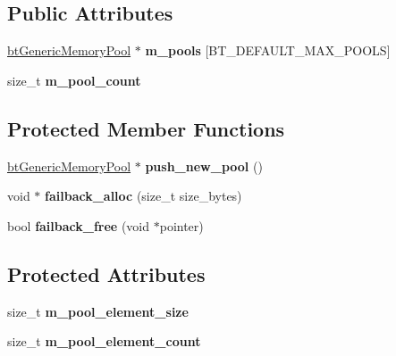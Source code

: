 \subsection*{Public Attributes}
\begin{DoxyCompactItemize}
\item 
\hypertarget{classbt_generic_pool_allocator_a6a423ffc81fd7032cf04c1c2203b9a60}{\hyperlink{classbt_generic_memory_pool}{bt\+Generic\+Memory\+Pool} $\ast$ {\bfseries m\+\_\+pools} \mbox{[}B\+T\+\_\+\+D\+E\+F\+A\+U\+L\+T\+\_\+\+M\+A\+X\+\_\+\+P\+O\+O\+L\+S\mbox{]}}\label{classbt_generic_pool_allocator_a6a423ffc81fd7032cf04c1c2203b9a60}

\item 
\hypertarget{classbt_generic_pool_allocator_a683e472dcc9efbc63a9218ba2e1a4dc4}{size\+\_\+t {\bfseries m\+\_\+pool\+\_\+count}}\label{classbt_generic_pool_allocator_a683e472dcc9efbc63a9218ba2e1a4dc4}

\end{DoxyCompactItemize}
\subsection*{Protected Member Functions}
\begin{DoxyCompactItemize}
\item 
\hypertarget{classbt_generic_pool_allocator_a1de453f3e3f6fffa62ff6ac46466af0b}{\hyperlink{classbt_generic_memory_pool}{bt\+Generic\+Memory\+Pool} $\ast$ {\bfseries push\+\_\+new\+\_\+pool} ()}\label{classbt_generic_pool_allocator_a1de453f3e3f6fffa62ff6ac46466af0b}

\item 
\hypertarget{classbt_generic_pool_allocator_a6c04580d308b8dd29b1e6e26eb69ac54}{void $\ast$ {\bfseries failback\+\_\+alloc} (size\+\_\+t size\+\_\+bytes)}\label{classbt_generic_pool_allocator_a6c04580d308b8dd29b1e6e26eb69ac54}

\item 
\hypertarget{classbt_generic_pool_allocator_a7a8a33e2e4350d452d468b6a42ccf233}{bool {\bfseries failback\+\_\+free} (void $\ast$pointer)}\label{classbt_generic_pool_allocator_a7a8a33e2e4350d452d468b6a42ccf233}

\end{DoxyCompactItemize}
\subsection*{Protected Attributes}
\begin{DoxyCompactItemize}
\item 
\hypertarget{classbt_generic_pool_allocator_afaabd371d1062a16b62f584c7e06e1d5}{size\+\_\+t {\bfseries m\+\_\+pool\+\_\+element\+\_\+size}}\label{classbt_generic_pool_allocator_afaabd371d1062a16b62f584c7e06e1d5}

\item 
\hypertarget{classbt_generic_pool_allocator_a03e6c8bfe59622aeb9f6744802e5e5c5}{size\+\_\+t {\bfseries m\+\_\+pool\+\_\+element\+\_\+count}}\label{classbt_generic_pool_allocator_a03e6c8bfe59622aeb9f6744802e5e5c5}

\end{DoxyCompactItemize}


